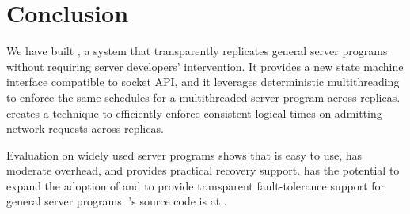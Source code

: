 \section{Conclusion} \label{sec:conclusion}
We have built \xxx, a \smr system that 
transparently replicates general server programs without 
requiring server developers' intervention. It provides a new state machine 
interface compatible to socket API, and it leverages 
deterministic multithreading to enforce the same schedules for a multithreaded 
server program across replicas. \xxx creates a \timealgo technique to 
efficiently enforce consistent logical times on admitting network requests 
across replicas.

Evaluation on \nprog widely used server programs shows that 
\xxx is easy to use, has moderate overhead, and provides practical recovery 
support. \xxx has the potential to expand the adoption of \smr and to provide 
transparent fault-tolerance support for general server programs. \xxx's 
source code is at \github.
